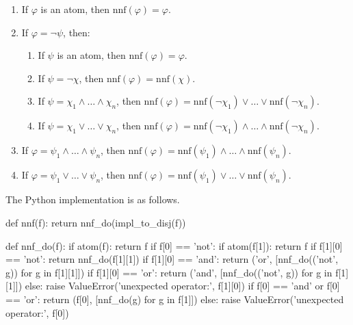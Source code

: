 \documentclass[a4paper,notitlepage]{scrartcl}
\let\phi\varphi
\begin{document}
\begin{enumerate}

\item
If $\phi$ is an atom, then $\mathrm{nnf}(\phi) = \phi$.

\item
If $\phi = \lnot\psi$, then:

\begin{enumerate}

\item
If $\psi$ is an atom, then $\mathrm{nnf}(\phi) = \phi$.

\item
If $\psi = \lnot\chi$, then $\mathrm{nnf}(\phi) = \mathrm{nnf}(\chi)$.

\item
If $\psi = \chi_1 \land \ldots \land \chi_n$, then $\mathrm{nnf}(\phi) =
\mathrm{nnf}(\lnot\chi_1) \lor \ldots \lor \mathrm{nnf}(\lnot\chi_n)$.

\item
If $\psi = \chi_1 \lor \ldots \lor \chi_n$, then $\mathrm{nnf}(\phi) =
\mathrm{nnf}(\lnot\chi_1) \land \ldots \land \mathrm{nnf}(\lnot\chi_n)$.

\end{enumerate}

\item
If $\phi = \psi_1 \land \ldots \land \psi_n$, then $\mathrm{nnf}(\phi) =
\mathrm{nnf}(\psi_1) \land \ldots \land \mathrm{nnf}(\psi_n)$.

\item
If $\phi = \psi_1 \lor \ldots \lor \psi_n$, then $\mathrm{nnf}(\phi) =
\mathrm{nnf}(\psi_1) \lor \ldots \lor \mathrm{nnf}(\psi_n)$.

\end{enumerate}

\noindent
The Python implementation is as follows.

\begin{code}
def nnf(f):
    return nnf_do(impl_to_disj(f))

def nnf_do(f):
    if atom(f):
        return f
    if f[0] == 'not':
        if atom(f[1]):
            return f
        if f[1][0] == 'not':
            return nnf_do(f[1][1])
        if f[1][0] == 'and':
            return ('or', [nnf_do(('not', g)) for g in f[1][1]])
        if f[1][0] == 'or':
            return ('and', [nnf_do(('not', g)) for g in f[1][1]])
        else:
            raise ValueError('unexpected operator:', f[1][0])
    if f[0] == 'and' or f[0] == 'or':
        return (f[0], [nnf_do(g) for g in f[1]])
    else:
        raise ValueError('unexpected operator:', f[0])
\end{code}
\end{document}
